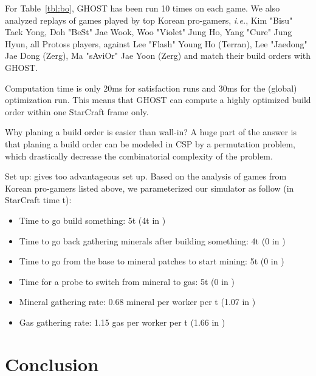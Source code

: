 \documentclass[journal]{IEEEtran}
\newcommand{\csp}{\textsc{CSP}\xspace}
\newcommand{\ghost}{\textsc{GHOST}\xspace}
\newcommand{\ie}{\textit{i.e.}}
\begin{document}
For Table~\ref{tbl:bo}, \ghost has been run  10 times on each game. We
also analyzed replays  of games played by top  Korean pro-gamers, \ie,
Kim "Bisu" Taek Yong, Doh "BeSt"  Jae Wook, Woo "Violet" Jung Ho, Yang
"Cure" Jung  Hyun, all Protoss  players, against Lee "Flash"  Young Ho
(Terran), Lee "Jaedong"  Jae Dong (Zerg), Ma "sAviOr"  Jae Yoon (Zerg)
and match their build orders with \ghost {}.

Computation time is  only 20ms for satisfaction runs and  30ms for the
(global) optimization run. This means that \ghost can compute a highly
optimized build order within one StarCraft frame only.

Why planing a build  order is easier than wall-in? A  huge part of the
answer is  that planing  a build  order can  be modeled  in \csp  by a
permutation  problem,  which  drastically decrease  the  combinatorial
complexity of the problem.

Set up:  \cite{ChurchillB11} gives too  advantageous set up.  Based on
the  analysis  of  games  from  Korean  pro-gamers  listed  above,  we
parameterized our simulator as follow (in StarCraft time t):
\begin{itemize}
\item Time to go build something: 5t (4t in \cite{ChurchillB11})
\item Time to go back gathering minerals after building something: 4t (0 in \cite{ChurchillB11})
\item Time to go from the base to mineral patches to start mining: 5t (0 in \cite{ChurchillB11})
\item Time for a probe to switch from mineral to gas: 5t (0 in \cite{ChurchillB11})
\item Mineral gathering rate: 0.68 mineral per worker per t (1.07 in \cite{ChurchillB11})
\item Gas gathering rate: 1.15 gas per worker per t (1.66 in \cite{ChurchillB11})
\end{itemize}  


\section{Conclusion}\label{sec:conclusion}





\end{document}

